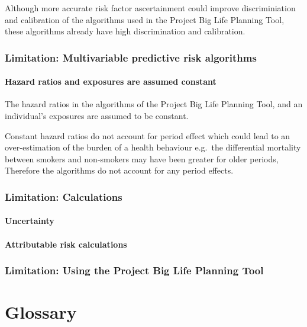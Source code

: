 \documentclass[]{book}
\begin{document}
Although more accurate risk factor ascertainment could improve
discriminiation and calibration of the algorithms used in the Project
Big Life Planning Tool, these algorithms already have high
discrimination and calibration.

\subsection{Limitation: Multivariable predictive risk
algorithms}\label{limitation-multivariable-predictive-risk-algorithms}

\subsubsection{Hazard ratios and exposures are assumed
constant}\label{hazard-ratios-and-exposures-are-assumed-constant}

The hazard ratios in the algorithms of the Project Big Life Planning
Tool, and an individual's exposures are assumed to be constant.

Constant hazard ratios do not account for period effect which could lead
to an over-estimation of the burden of a health behaviour e.g.~the
differential mortality between smokers and non-smokers may have been
greater for older periods, Therefore the algorithms do not account for
any period effects.

\subsection{Limitation: Calculations}\label{limitation-calculations}

\subsubsection{Uncertainty}\label{uncertainty}

\subsubsection{Attributable risk
calculations}\label{attributable-risk-calculations}

\subsection{Limitation: Using the Project Big Life Planning
Tool}\label{limitation-using-the-project-big-life-planning-tool}

\hypertarget{glossary}{\chapter{Glossary}\label{glossary}}
\end{document}
